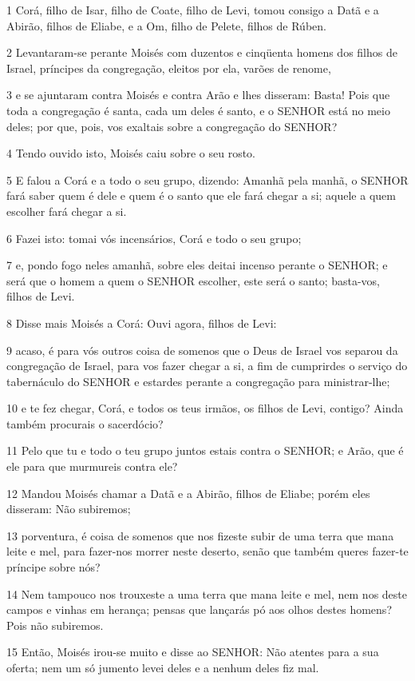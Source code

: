 \par 1 Corá, filho de Isar, filho de Coate, filho de Levi, tomou consigo a Datã e a Abirão, filhos de Eliabe, e a Om, filho de Pelete, filhos de Rúben.
\par 2 Levantaram-se perante Moisés com duzentos e cinqüenta homens dos filhos de Israel, príncipes da congregação, eleitos por ela, varões de renome,
\par 3 e se ajuntaram contra Moisés e contra Arão e lhes disseram: Basta! Pois que toda a congregação é santa, cada um deles é santo, e o SENHOR está no meio deles; por que, pois, vos exaltais sobre a congregação do SENHOR?
\par 4 Tendo ouvido isto, Moisés caiu sobre o seu rosto.
\par 5 E falou a Corá e a todo o seu grupo, dizendo: Amanhã pela manhã, o SENHOR fará saber quem é dele e quem é o santo que ele fará chegar a si; aquele a quem escolher fará chegar a si.
\par 6 Fazei isto: tomai vós incensários, Corá e todo o seu grupo;
\par 7 e, pondo fogo neles amanhã, sobre eles deitai incenso perante o SENHOR; e será que o homem a quem o SENHOR escolher, este será o santo; basta-vos, filhos de Levi.
\par 8 Disse mais Moisés a Corá: Ouvi agora, filhos de Levi:
\par 9 acaso, é para vós outros coisa de somenos que o Deus de Israel vos separou da congregação de Israel, para vos fazer chegar a si, a fim de cumprirdes o serviço do tabernáculo do SENHOR e estardes perante a congregação para ministrar-lhe;
\par 10 e te fez chegar, Corá, e todos os teus irmãos, os filhos de Levi, contigo? Ainda também procurais o sacerdócio?
\par 11 Pelo que tu e todo o teu grupo juntos estais contra o SENHOR; e Arão, que é ele para que murmureis contra ele?
\par 12 Mandou Moisés chamar a Datã e a Abirão, filhos de Eliabe; porém eles disseram: Não subiremos;
\par 13 porventura, é coisa de somenos que nos fizeste subir de uma terra que mana leite e mel, para fazer-nos morrer neste deserto, senão que também queres fazer-te príncipe sobre nós?
\par 14 Nem tampouco nos trouxeste a uma terra que mana leite e mel, nem nos deste campos e vinhas em herança; pensas que lançarás pó aos olhos destes homens? Pois não subiremos.
\par 15 Então, Moisés irou-se muito e disse ao SENHOR: Não atentes para a sua oferta; nem um só jumento levei deles e a nenhum deles fiz mal.
